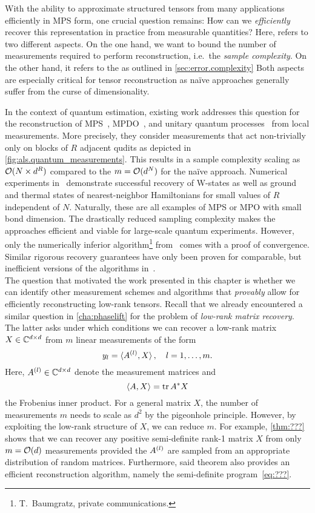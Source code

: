 With the ability to approximate structured tensors from many applications efficiently in MPS form, one crucial question remains:
How can we \emph{efficiently} recover this representation in practice from measurable quantities?
Here,  refers to two different aspects.
On the one hand, we want to bound the number of measurements required to perform reconstruction, i.e.\ the \emph{sample complexity}.
On the other hand, it refers to the  as outlined in \cref{sec:error.complexity}
Both aspects are especially critical for tensor reconstruction as na\"ive approaches generally suffer from the curse of dimensionality.

In the context of quantum estimation, existing work addresses this question for the reconstruction of MPS~\cite{Cramer_2010_Efficient}, MPDO~\cite{Baumgratz,Baugratz,Lanyon}, and unitary quantum processes~\cite{Holzaepfel} from local measurements.
More precisely, they consider measurements that act non-trivially only on blocks of $R$ adjacent qudits as depicted in \cref{fig:als.quantum_measurements}.
This results in a sample complexity scaling as ${\mathcal{O}}(N \times d^R)$ compared to the $m = {\mathcal{O}}(d^N)$ for the na\"ive approach.
Numerical experiments in~\cite{Cramer,Baumgratz,Baumgratz} demonstrate successful recovery of W-states as well as ground and thermal states of nearest-neighbor Hamiltonians for small values of $R$ independent of $N$.
Naturally, these are all examples of MPS or MPO with small bond dimension.
The drastically reduced sampling complexity makes the approaches efficient and viable for large-scale quantum experiments.
However, only the numerically inferior algorithm\footnote{%
  T.\ Baumgratz, private communications.
}
from~\cite{Baumgratz} comes with a proof of convergence.
Similar rigorous recovery guarantees have only been proven for comparable, but inefficient versions of the algorithms in~\cite{Cramer,Baumgratz}.\\



The question that motivated the work presented in this chapter is whether we can identify other measurement schemes and algorithms that \emph{provably} allow for efficiently reconstructing low-rank tensors.
Recall that we already encountered a similar question in \cref{cha:phaselift} for the problem of \emph{low-rank matrix recovery}.
The latter asks under which conditions we can recover a low-rank matrix $X \in {\mathbb{C}}^{d \times d}$ from $m$ linear measurements of the form
\[
  y_l = \braket{A^{(l)}, X}, \quad l=1, \ldots, m.
  \label{eq:als.matrix_measurements}
\]
Here, $A^{(l)} \in {\mathbb{C}}^{d \times d}$ denote the measurement matrices and
\[
  \braket{A, X} = \operatorname{tr} {{A}^\ast} X
\]
the Frobenius inner product.
For a general matrix $X$, the number of measurements $m$ needs to scale as $d^2$ by the pigeonhole principle.
However, by exploiting the low-rank structure of $X$, we can reduce $m$.
For example, \cref{thm:???} shows that we can recover any positive semi-definite rank-1 matrix $X$ from only $m = {\mathcal{O}}(d)$ measurements provided the $A^{(l)}$ are sampled from an appropriate distribution of random matrices.
Furthermore, said theorem also provides an efficient reconstruction algorithm, namely the semi-definite program~\eqref{eq:???}.

